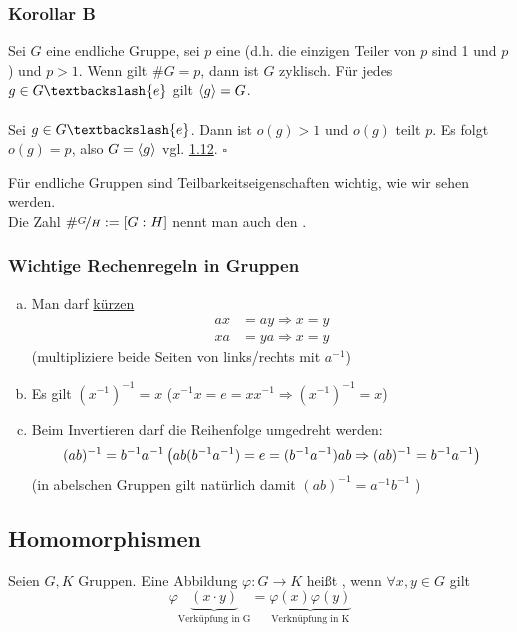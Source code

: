 \subsubsection*{Korollar B}
Sei $G$ eine endliche Gruppe, sei $p$ eine   (d.h. die einzigen Teiler von $p$ sind 1 und $p$) und $p>1$. Wenn gilt $\#G=p$, dann ist $G$ zyklisch. Für jedes $g\in G \textbackslash\{e\}$ gilt $\langle g \rangle=G$.\\
\\
Sei $g \in G\textbackslash\{e\}$. Dann ist $o(g)>1$ und $o(g)$ teilt $p$. Es folgt $o(g)=p$, also $G=\langle g \rangle$ vgl. \hyperref[sub:zyklische_gruppen]{1.12}.
\hfill $\square$

Für endliche Gruppen sind Teilbarkeitseigenschaften wichtig, wie wir sehen werden.\\
Die Zahl $\#\nicefrac{G}{H}:=[G:H]$ nennt man auch den .

\subsubsection*{Wichtige Rechenregeln in Gruppen}
\begin{enumerate}[(a)]
	\item Man darf \uline{kürzen}
	\begin{equation*}
	\begin{aligned}
		ax &= ay \Rightarrow x=y\\
		xa &= ya \Rightarrow x=y
	\end{aligned}
	\end{equation*}
	(multipliziere beide Seiten von links/rechts mit $a^{-1}$)
	\item Es gilt $(x^{-1})^{-1}=x$   ($x^{-1}x=e=xx^{-1} \Rightarrow (x^{-1})^{-1}=x$)
	\item Beim Invertieren darf die Reihenfolge umgedreht werden:\\
	\[(ab)^{-1}=b^{-1}a^{-1}\\
	\left( ab(b^{-1}a^{-1})=e=(b^{-1}a^{-1})ab \Rightarrow (ab)^{-1}=b^{-1}a^{-1}\right)
	\]
	(in abelschen Gruppen gilt natürlich damit $(ab)^{-1}=a^{-1}b^{-1}$ )
\end{enumerate}
\subsection{Homomorphismen}
\label{sub:homomorphismen}
Seien $G,K$ Gruppen. Eine Abbildung $\varphi: G \to K$ heißt , wenn $\forall x,y \in G$ gilt
\[\varphi\underbrace{(x\cdot y)}_{\text{Verküpfung in G} } =\underbrace{\varphi(x)\varphi(y)}_{\text{Verknüpfung in K}} \]

